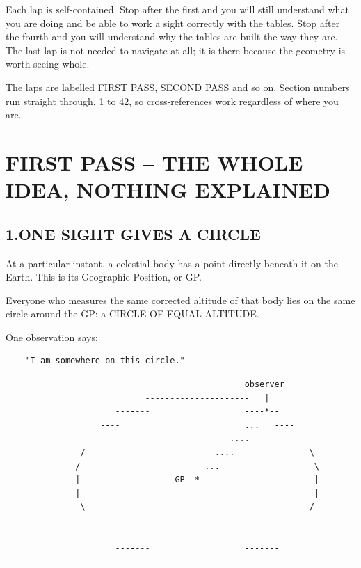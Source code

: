 \documentclass[11pt]{article}
\begin{document}
Each lap is self-contained. Stop after the first and you will still understand what you are doing and be able to work a sight correctly with the tables. Stop after the fourth and you will understand why the tables are built the way they are. The last lap is not needed to navigate at all; it is there because the geometry is worth seeing whole.

The laps are labelled FIRST PASS, SECOND PASS and so on. Section numbers run straight through, 1 to 42, so cross-references work regardless of where you are.

\clearpage
\tableofcontents
\clearpage
\section*{FIRST PASS -- THE WHOLE IDEA, NOTHING EXPLAINED}

\subsection*{1.\quad ONE SIGHT GIVES A CIRCLE}

At a particular instant, a celestial body has a point directly beneath it on the Earth. This is its Geographic Position, or GP.

Everyone who measures the same corrected altitude of that body lies on the same circle around the GP: a CIRCLE OF EQUAL ALTITUDE.

One observation says:

\begin{verbatim}
    "I am somewhere on this circle."
\end{verbatim}

\begin{verbatim}
                                                observer
                            ---------------------   |
                      -------                   ----*--
                   ----                         ...   ----
                ---                          ....         ---
               /                          ....               \
              /                         ...                   \
              |                   GP  *                       |
              |                                               |
               \                                             /
                ---                                       ---
                   ----                               ----
                      -------                   -------
                            ---------------------
\end{verbatim}
\end{document}
